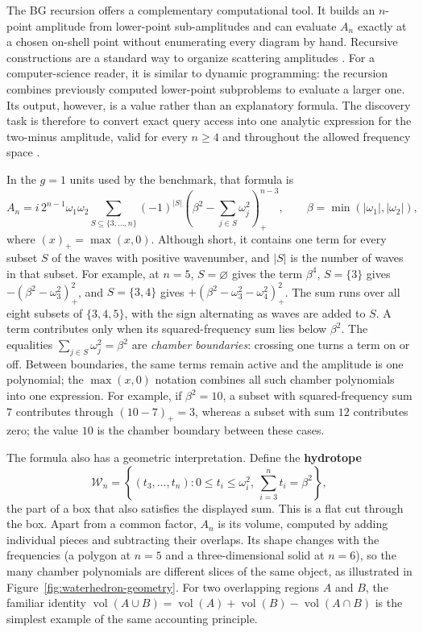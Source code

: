 \documentclass{article}
\begin{document}
The BG recursion offers a complementary computational tool. It builds an
$n$-point amplitude from lower-point sub-amplitudes and can evaluate $A_n$
exactly at a chosen on-shell point without enumerating every diagram by hand.
Recursive constructions are a standard way to organize scattering amplitudes
\citep{Berends1988Recursive,Britto2005BCFW}.
For a computer-science reader, it is similar to dynamic programming: the
recursion combines previously computed lower-point subproblems to evaluate a
larger one.
Its output, however, is a value rather than an explanatory formula. The
discovery task is therefore to convert exact query access into one analytic
expression for the two-minus amplitude, valid for every $n\geq4$ and throughout
the allowed frequency space \citep{Arkani-Hamed2026SurfaceWW}.

In the $g=1$ units used by the benchmark, that formula is
\begin{equation}
A_n =
i\,2^{n-1}\omega_1\omega_2
\sum_{S\subseteq\{3,\ldots,n\}}(-1)^{|S|}
\left(\beta^2-\sum_{j\in S}\omega_j^2\right)_+^{n-3},
\qquad
\beta=\min(|\omega_1|,|\omega_2|),
\label{eq:key}
\end{equation}
where $(x)_+=\max(x,0)$. Although short, it contains one term for every subset
$S$ of the waves with positive wavenumber, and $|S|$ is the number of waves in that
subset. For example, at $n=5$, $S=\varnothing$ gives the term $\beta^4$,
$S=\{3\}$ gives $-(\beta^2-\omega_3^2)_+^2$, and $S=\{3,4\}$ gives
$+(\beta^2-\omega_3^2-\omega_4^2)_+^2$. The sum runs over all eight subsets
of $\{3,4,5\}$, with the sign alternating as waves are added to $S$. A term contributes only when its
squared-frequency sum lies below $\beta^2$. The equalities
$\sum_{j\in S}\omega_j^2=\beta^2$ are \emph{chamber boundaries}: crossing one turns
a term on or off. Between boundaries, the same terms remain active and the amplitude
is one polynomial; the $\max(x,0)$ notation combines all such chamber
polynomials into one expression.
For example, if $\beta^2=10$, a subset with squared-frequency sum $7$
contributes through $(10-7)_+=3$, whereas a subset with sum $12$ contributes
zero; the value $10$ is the chamber boundary between these cases.

The formula also has a geometric interpretation. Define the \textbf{hydrotope}
\[
\mathcal{W}_n=\left\{(t_3,\ldots,t_n):0\leq t_i\leq \omega_i^2,\
\sum_{i=3}^n t_i=\beta^2\right\},
\]
the part of a box that also satisfies the displayed sum. This is a flat cut
through the box. Apart from a common factor, $A_n$ is its volume, computed by
adding individual pieces and subtracting their overlaps. Its shape changes
with the frequencies (a polygon at $n=5$ and a three-dimensional solid at $n=6$), so
the many chamber polynomials are different slices of the same object, as illustrated in
Figure~\ref{fig:waterhedron-geometry}.
For two overlapping regions $A$ and $B$, the familiar identity
$\operatorname{vol}(A\cup B)=\operatorname{vol}(A)+\operatorname{vol}(B)
-\operatorname{vol}(A\cap B)$ is the simplest example of the same accounting
principle.
\end{document}
